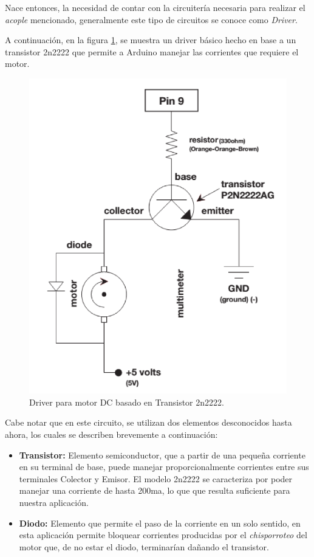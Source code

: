 \documentclass[letterpaper, 10pt]{report}
\begin{document}
Nace entonces, la necesidad de contar con la circuitería necesaria para realizar el \emph{acople} mencionado, generalmente este tipo de circuitos se conoce como \emph{Driver}.

A continuación, en la figura \ref{driverDC}, se muestra un driver básico hecho en base a un transistor 2n2222 que permite a Arduino manejar las corrientes que requiere el motor.

\begin{figure}[h]
\centering
\includegraphics[scale=0.5]{driverDC.png}
\caption{Driver para motor DC basado en Transistor 2n2222.\label{driverDC}}
\end{figure}

Cabe notar que en este circuito, se utilizan dos elementos desconocidos hasta ahora, los cuales se describen brevemente a continuación:

\begin{itemize}
	\item {\bf Transistor:} Elemento semiconductor, que a partir de una pequeña corriente en su terminal de base, puede manejar proporcionalmente corrientes entre sus terminales Colector y Emisor. 		
	El modelo 2n2222 se caracteriza por poder manejar una corriente de hasta 200ma, lo que que resulta suficiente para nuestra aplicación.
	
	\item {\bf Diodo:} Elemento que permite el paso de la corriente en un solo sentido, en esta aplicación permite 
	bloquear corrientes producidas por el \emph{chisporroteo} del motor que, de no estar el diodo, terminarían dañando el transistor.
\end{itemize}
\end{document}
